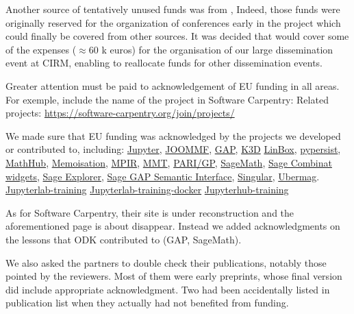 Another source of tentatively unused funds was from ,
Indeed, those funds were originally reserved for the organization of
conferences early in the project which could finally be covered from
other sources. It was decided that  would cover some of
the expenses ($\approx$60 k euros) for the organisation of our large
dissemination event at CIRM, enabling  to reallocate funds
for other dissemination events.

\begin{recommendation}
  Greater attention must be paid to acknowledgement of EU funding in
  all areas. For exemple, include the name of the project in Software
  Carpentry: Related projects:
  \url{https://software-carpentry.org/join/projects/}
\end{recommendation}

We made sure that EU funding was acknowledged by the projects we
developed or contributed to, including:
\href{https://jupyter.org/about}{Jupyter},
\href{http://joommf.github.io/}{JOOMMF},
\href{https://www.gap-system.org/Contacts/funding.html}{GAP},
\href{https://github.com/K3D-tools/K3D-jupyter}{K3D}
\href{https://linalg.org/support.html}{LinBox},
\href{https://pypersist.readthedocs.io/}{pypersist},
\href{https://mathhub.info/}{MathHub},
\href{https://gap-packages.github.io/Memoisation/}{Memoisation},
\href{http://www.mpir.org/news.html}{MPIR},
\href{https://uniformal.github.io//doc/}{MMT},
\href{https://pari.math.u-bordeaux.fr/funding.html}{PARI/GP},
\href{https://www.sagemath.org/development-ack.html}{SageMath},
\href{https://github.com/sagemath/sage-combinat-widgets}{Sage Combinat widgets},
\href{https://github.com/sagemath/sage-explorer}{Sage Explorer},
\href{https://github.com/nthiery/sage-gap-semantic-interface}{Sage GAP Semantic Interface},
\href{https://www.singular.uni-kl.de/index.php/background/funding.html}{Singular},
\href{https://ubermag.github.io/}{Ubermag}.
\href{https://gitlab.com/logilab/jupyterlab-training}{Jupyterlab-training}
\href{https://gitlab.com/logilab/jupyterlab-training-docker}{Jupyterlab-training-docker}
\href{https://gitlab.com/logilab/jupyterhub-training}{Jupyterhub-training}


As for Software Carpentry, their site is under reconstruction and the
aforementioned page is about disappear. Instead we added
acknowledgments on the lessons that ODK contributed to (GAP,
SageMath).

We also asked the partners to double check their publications, notably
those pointed by the reviewers. Most of them were early preprints,
whose final version did include appropriate acknowledgment. Two had
been accidentally listed in \ODK publication list when they actually
had not benefited from \ODK funding.

